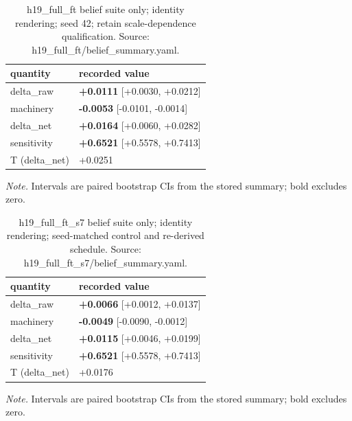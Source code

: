 \documentclass[10pt]{article}
\begin{document}
\begin{table}[H]
\centering
\footnotesize
\caption{ h19\_full\_ft belief suite only; identity rendering; seed 42; retain scale-dependence qualification. Source: h19\_full\_ft/belief\_summary.yaml. }
\label{tab:belief_transfer}



\begin{tabular}{ ll }
\toprule
quantity & recorded value \\
\midrule

delta\_raw & \textbf{+0.0111} [+0.0030, +0.0212] \\

machinery & \textbf{-0.0053} [-0.0101, -0.0014] \\

delta\_net & \textbf{+0.0164} [+0.0060, +0.0282] \\

sensitivity & \textbf{+0.6521} [+0.5578, +0.7413] \\

T (delta\_net) & +0.0251 \\

\bottomrule
\end{tabular}

\par\footnotesize\emph{Note.} Intervals are paired bootstrap CIs from the stored summary; bold excludes zero.
\end{table}


\begin{table}[H]
\centering
\footnotesize
\caption{ h19\_full\_ft\_s7 belief suite only; identity rendering; seed-matched control and re-derived schedule. Source: h19\_full\_ft\_s7/belief\_summary.yaml. }
\label{tab:belief_transfer}



\begin{tabular}{ ll }
\toprule
quantity & recorded value \\
\midrule

delta\_raw & \textbf{+0.0066} [+0.0012, +0.0137] \\

machinery & \textbf{-0.0049} [-0.0090, -0.0012] \\

delta\_net & \textbf{+0.0115} [+0.0046, +0.0199] \\

sensitivity & \textbf{+0.6521} [+0.5578, +0.7413] \\

T (delta\_net) & +0.0176 \\

\bottomrule
\end{tabular}

\par\footnotesize\emph{Note.} Intervals are paired bootstrap CIs from the stored summary; bold excludes zero.
\end{table}
\end{document}
